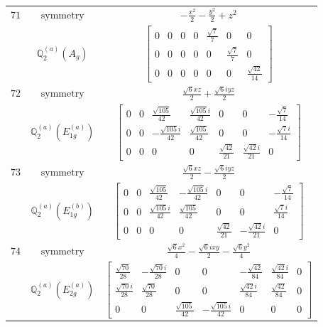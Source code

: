 \documentclass[fleqn,8pt,landscape]{jsarticle}
\begin{document}
\begin{longtable}{ccc}
$ 71 $ & $ \text{symmetry} $ & $ - \frac{x^{2}}{2} - \frac{y^{2}}{2} + z^{2} $ \\
$  $ & $ \mathbb{Q}_{2}^{(a)}(A_{g}) $ & $ \begin{bmatrix} 0 & 0 & 0 & 0 & \frac{\sqrt{7}}{7} & 0 & 0 \\ 0 & 0 & 0 & 0 & 0 & \frac{\sqrt{7}}{7} & 0 \\ 0 & 0 & 0 & 0 & 0 & 0 & \frac{\sqrt{42}}{14} \end{bmatrix} $ \\ \hline
$ 72 $ & $ \text{symmetry} $ & $ \frac{\sqrt{6} x z}{2} + \frac{\sqrt{6} i y z}{2} $ \\
$  $ & $ \mathbb{Q}_{2}^{(a)}(E_{1g}^{(a)}) $ & $ \begin{bmatrix} 0 & 0 & \frac{\sqrt{105}}{42} & \frac{\sqrt{105} i}{42} & 0 & 0 & - \frac{\sqrt{7}}{14} \\ 0 & 0 & - \frac{\sqrt{105} i}{42} & \frac{\sqrt{105}}{42} & 0 & 0 & - \frac{\sqrt{7} i}{14} \\ 0 & 0 & 0 & 0 & \frac{\sqrt{42}}{21} & \frac{\sqrt{42} i}{21} & 0 \end{bmatrix} $ \\ \hline
$ 73 $ & $ \text{symmetry} $ & $ \frac{\sqrt{6} x z}{2} - \frac{\sqrt{6} i y z}{2} $ \\
$  $ & $ \mathbb{Q}_{2}^{(a)}(E_{1g}^{(b)}) $ & $ \begin{bmatrix} 0 & 0 & \frac{\sqrt{105}}{42} & - \frac{\sqrt{105} i}{42} & 0 & 0 & - \frac{\sqrt{7}}{14} \\ 0 & 0 & \frac{\sqrt{105} i}{42} & \frac{\sqrt{105}}{42} & 0 & 0 & \frac{\sqrt{7} i}{14} \\ 0 & 0 & 0 & 0 & \frac{\sqrt{42}}{21} & - \frac{\sqrt{42} i}{21} & 0 \end{bmatrix} $ \\ \hline
$ 74 $ & $ \text{symmetry} $ & $ \frac{\sqrt{6} x^{2}}{4} - \frac{\sqrt{6} i x y}{2} - \frac{\sqrt{6} y^{2}}{4} $ \\
$  $ & $ \mathbb{Q}_{2}^{(a)}(E_{2g}^{(a)}) $ & $ \begin{bmatrix} \frac{\sqrt{70}}{28} & - \frac{\sqrt{70} i}{28} & 0 & 0 & - \frac{\sqrt{42}}{84} & \frac{\sqrt{42} i}{84} & 0 \\ \frac{\sqrt{70} i}{28} & \frac{\sqrt{70}}{28} & 0 & 0 & \frac{\sqrt{42} i}{84} & \frac{\sqrt{42}}{84} & 0 \\ 0 & 0 & \frac{\sqrt{105}}{42} & - \frac{\sqrt{105} i}{42} & 0 & 0 & 0 \end{bmatrix} $ \\ \hline

\end{longtable}
\end{document}
